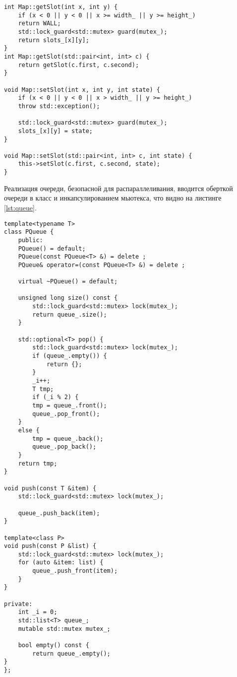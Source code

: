 \begin{lstlisting}[label=lst:matrix,caption=Реализация класса матрицы - бинарного лабиринта]
int Map::getSlot(int x, int y) {
	if (x < 0 || y < 0 || x >= width_ || y >= height_)
	return WALL;
	std::lock_guard<std::mutex> guard(mutex_);
	return slots_[x][y];
}
int Map::getSlot(std::pair<int, int> c) {
	return getSlot(c.first, c.second);
}

void Map::setSlot(int x, int y, int state) {
	if (x < 0 || y < 0 || x > width_ || y >= height_)
	throw std::exception();
	
	std::lock_guard<std::mutex> guard(mutex_);
	slots_[x][y] = state;
}

void Map::setSlot(std::pair<int, int> c, int state) {
	this->setSlot(c.first, c.second, state);
}
\end{lstlisting}

Реализация очереди, безопасной для распараллеливания, вводится оберткой очереди в класс и инкапсулированием мьютекса, что видно на листинге \ref{lst:queue}.

 \begin{lstlisting}[label=lst:queue,caption=Шаблонный класс очереди]
template<typename T>
class PQueue {
	public:
	PQueue() = default;
	PQueue(const PQueue<T> &) = delete ;
	PQueue& operator=(const PQueue<T> &) = delete ;
	
	virtual ~PQueue() = default;
	
	unsigned long size() const {
		std::lock_guard<std::mutex> lock(mutex_);
		return queue_.size();
	}
	
	std::optional<T> pop() {
		std::lock_guard<std::mutex> lock(mutex_);
		if (queue_.empty()) {
			return {};
		}
		_i++;
		T tmp;
		if (_i % 2) {
		tmp = queue_.front();
		queue_.pop_front();
	}
	else {
		tmp = queue_.back();
		queue_.pop_back();
	}
	return tmp;
}

void push(const T &item) {
	std::lock_guard<std::mutex> lock(mutex_);
	
	queue_.push_back(item);
}

template<class P>
void push(const P &list) {
	std::lock_guard<std::mutex> lock(mutex_);
	for (auto &item: list) {
		queue_.push_front(item);
	}
}

private:
	int _i = 0;
	std::list<T> queue_;
	mutable std::mutex mutex_;
	
	bool empty() const {
		return queue_.empty();
}
};
 \end{lstlisting}


\captionsetup{singlelinecheck = false, justification=raggedleft}
